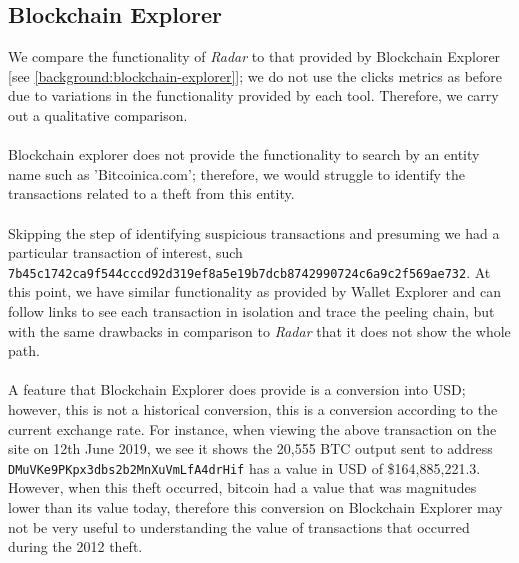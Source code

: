 \subsection{Blockchain Explorer}
We compare the functionality of \textit{Radar} to that provided by Blockchain Explorer [see \ref{background:blockchain-explorer}]; we do not use the clicks metrics as before due to variations in the functionality provided by each tool. Therefore, we carry out a qualitative comparison.
\\\\
Blockchain explorer does not provide the functionality to search by an entity name such as 'Bitcoinica.com'; therefore, we would struggle to identify the transactions related to a theft from this entity. 
\\\\
Skipping the step of identifying suspicious transactions and presuming we had a particular transaction of interest, such \texttt{7b45c1742ca9f544cccd92d319ef8a5e19b7dcb8742990724c6a9c2f569ae732}. At this point, we have similar functionality as provided by Wallet Explorer and can follow links to see each transaction in isolation and trace the peeling chain, but with the same drawbacks in comparison to \textit{Radar} that it does not show the whole path. 
\\\\
A feature that Blockchain Explorer does provide is a conversion into USD; however, this is not a historical conversion, this is a conversion according to the current exchange rate. For instance, when viewing the above transaction on the site on 12th June 2019, we see it shows the 20,555 BTC output sent to address \texttt{DMuVKe9PKpx3dbs2b2MnXuVmLfA4drHif} has a value in USD of \$164,885,221.3. However, when this theft occurred, bitcoin had a value that was magnitudes lower than its value today, therefore this conversion on Blockchain Explorer may not be very useful to understanding the value of transactions that occurred during the 2012 theft. 


